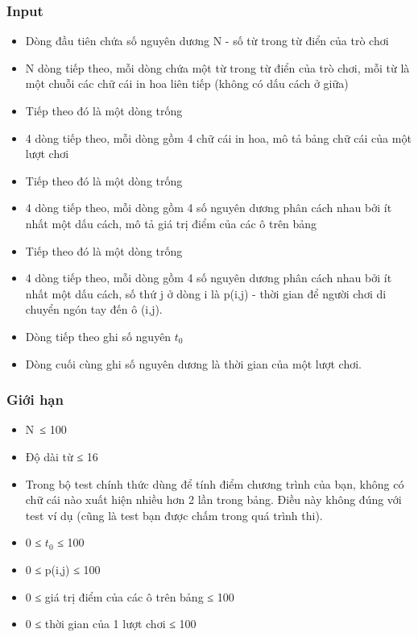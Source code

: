 \subsubsection{Input}
\begin{itemize}
	\item Dòng đầu tiên chứa số nguyên dương N - số từ trong từ điển của trò chơi
	\item N dòng tiếp theo, mỗi dòng chứa một từ trong từ điển của trò chơi, mỗi từ là một chuỗi các chữ cái in hoa liên tiếp (không có dấu cách ở giữa)
	\item Tiếp theo đó là một dòng trống
	\item 4 dòng tiếp theo, mỗi dòng gồm 4 chữ cái in hoa, mô tả bảng chữ cái của một lượt chơi
	\item Tiếp theo đó là một dòng trống
	\item 4 dòng tiếp theo, mỗi dòng gồm 4 số nguyên dương phân cách nhau bởi ít nhất một dấu cách, mô tả giá trị điểm của các ô trên bảng
	\item Tiếp theo đó là một dòng trống
	\item 4 dòng tiếp theo, mỗi dòng gồm 4 số nguyên dương phân cách nhau bởi ít nhất một dấu cách, số thứ j ở dòng i là p(i,j) - thời gian để người chơi di chuyển ngón tay đến ô (i,j).
	\item Dòng tiếp theo ghi số nguyên $t_{0}$
	\item Dòng cuối cùng ghi số nguyên dương là thời gian của một lượt chơi.
\end{itemize}

\subsubsection{Giới hạn}
\begin{itemize}
	\item N ≤ 100
	\item Độ dài từ ≤ 16
	\item Trong bộ test chính thức dùng để tính điểm chương trình của bạn, không có chữ cái nào xuất hiện nhiều hơn 2 lần trong bảng. Điều này không đúng với test ví dụ (cũng là test bạn được chấm trong quá trình thi).
	\item 0 ≤ $t_{0}$ ≤ 100
	\item 0 ≤ p(i,j) ≤ 100
	\item 0 ≤ giá trị điểm của các ô trên bảng ≤ 100
	\item 0 ≤ thời gian của 1 lượt chơi ≤ 100
\end{itemize}


